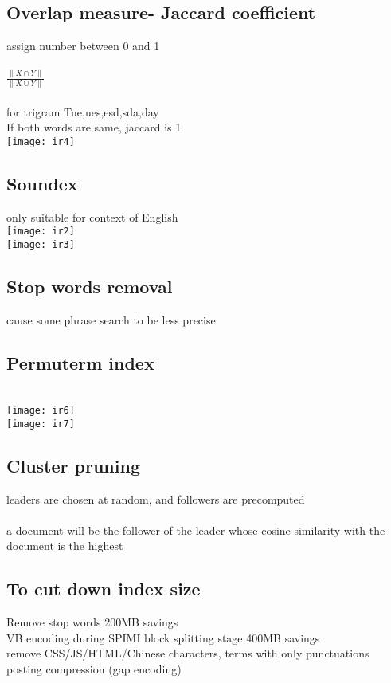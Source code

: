 \documentclass[11pt]{article}
\begin{document}
\begin{multicols*}{3}
\subsection*{Overlap measure- Jaccard coefficient}
assign number between 0 and 1
\\\\
$\frac{\| X \cap Y \|}{\| X \cup Y \| }$\\\\
for trigram Tue,ues,esd,sda,day\\ 
If both words are same, jaccard is 1\\
\texttt{[image: ir4]}\\
\subsection*{Soundex}
only suitable for context of English\\
\texttt{[image: ir2]}\\
\texttt{[image: ir3]}\\
\subsection*{Stop words removal}
cause some phrase search to be less precise
\subsection*{Permuterm index}\\
\texttt{[image: ir6]}\\
\texttt{[image: ir7]}
\subsection*{Cluster pruning}
leaders are chosen at random, and followers are precomputed\\\\
a document will be the follower of the leader whose cosine similarity with the document is the highest

\subsection*{To cut down index size}
Remove stop words 200MB savings\\
VB encoding during SPIMI block splitting stage 400MB savings\\
remove CSS/JS/HTML/Chinese characters, terms with only punctuations
posting compression (gap encoding)
\end{multicols*}
\end{document}
